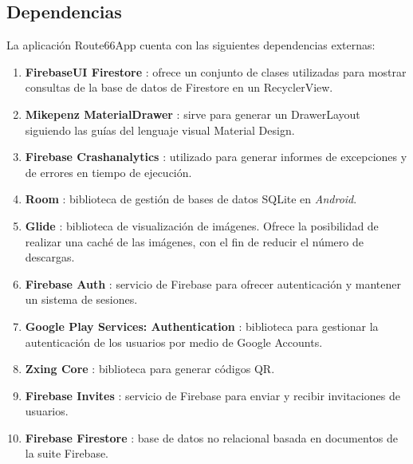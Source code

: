 \documentclass[twoside]{report}
\begin{document}
\subsection{Dependencias}

La aplicación Route66App cuenta con las siguientes dependencias externas:
\begin{enumerate}
\item \textbf{FirebaseUI Firestore} \cite{firebaseuifirestore}: ofrece un conjunto de clases utilizadas para mostrar consultas de la base de datos de Firestore en un RecyclerView.

\item  \textbf{Mikepenz MaterialDrawer} \cite{mikepenzmaterialdrawer}: sirve para generar un DrawerLayout siguiendo las guías del lenguaje visual Material Design.

\item \textbf{Firebase Crashanalytics} \cite{crashanalyticsfb}: utilizado para generar informes de excepciones y de errores en tiempo de ejecución.

\item \textbf{Room} \cite{roomdependencies}: biblioteca de gestión de bases de datos SQLite en \textit{Android}.

\item \textbf{Glide} \cite{glidedependencies}: biblioteca de visualización de imágenes. Ofrece la posibilidad de realizar una caché de las imágenes, con el fin de reducir el número de descargas.

\item \textbf{Firebase Auth} \cite{firebaseauthdependencies}: servicio de Firebase para ofrecer autenticación y mantener un sistema de sesiones.

\item \textbf{Google Play Services: Authentication} \cite{googleservicesauthdependencies}: biblioteca para gestionar la autenticación de los usuarios por medio de Google Accounts.

\item \textbf{Zxing Core} \cite{zxingdependencies}: biblioteca para generar códigos QR.

\item \textbf{Firebase Invites} \cite{finvitesdependencies}: servicio de Firebase para enviar y recibir invitaciones de usuarios.

\item \textbf{Firebase Firestore} \cite{ffirestoredependencies}: base de datos no relacional basada en documentos de la suite Firebase.


\end{enumerate}
\end{document}

